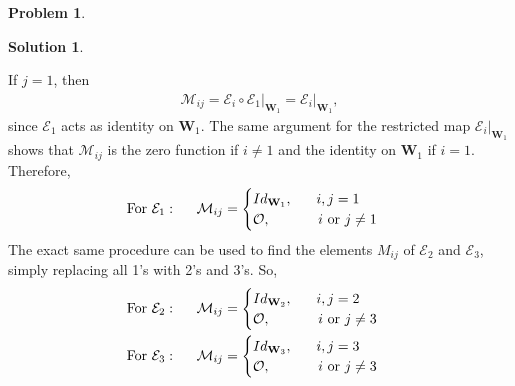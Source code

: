 \documentclass{book}
\theoremstyle{definition}
\newtheorem*{prob*}{Problem}
\newtheorem*{sln*}{Solution}
\newcommand{\W}{\mathbf{W}}
\newcommand{\M}{\mathcal{M}}
\newcommand{\E}{\mathcal{E}}
\begin{document}
\begin{prob*}
\begin{sln*}
\begin{enumerate}
			If $j = 1$, then 
			\begin{align*}
			\M_{ij} = \E_i \circ \E_1 \bigg\vert_{\W_1} = \E_i \bigg\vert_{\W_1},
			\end{align*} 
			since $\E_1$ acts as identity on $\W_1$. The same argument for the restricted map $\E_i\bigg\vert_{\W_1}$ shows that $\M_{ij}$ is the zero function if $i\neq 1$ and the identity on $\W_1$ if $i=1$. Therefore,
			\begin{align*}
			\text{For }\E_1:\hspace{0.5cm}
			\M_{ij} = \begin{cases}
			Id_{\W_1},\hspace{0.6cm}   i,j=1\\
			\mathcal{O},\hspace{1.2cm}    i\text{ or }j\neq 1
			\end{cases}
			\end{align*}
			The exact same procedure can be used to find the elements $M_{ij}$ of $\E_2$ and $\E_3$, simply replacing all 1's with 2's and 3's. So,
			\begin{align*}
			&\text{For }\E_2:\hspace{0.5cm}\M_{ij} = 
			\begin{cases}
			Id_{\W_2},\hspace{0.6cm}   i,j=2\\
			\mathcal{O},\hspace{1.2cm}    i\text{ or }j\neq 3
			\end{cases}\\
			&\text{For }\E_3:\hspace{0.5cm}\M_{ij} = 
			\begin{cases}
			Id_{\W_3},\hspace{0.6cm}   i,j=3\\
			\mathcal{O},\hspace{1.2cm}    i\text{ or }j\neq 3
			\end{cases}
			\end{align*}
			
			
			
			
			
			
			
			
			
			
		
			
		\end{enumerate} 
		
	\end{sln*}
	
\end{prob*}
\end{document}
